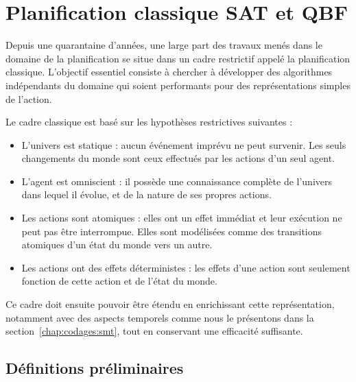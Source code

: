 \section{Planification classique SAT et QBF}\label{chap:codages:satqbf}
%

Depuis une quarantaine d’années, une large part des travaux menés dans le domaine de la planification se situe dans un cadre restrictif appelé la planification classique. L’objectif essentiel consiste à chercher à développer des algorithmes indépendants du domaine qui soient performants pour des représentations simples de l'action.

Le cadre classique est basé sur les hypothèses restrictives suivantes :
\begin{itemize}
\item L’univers est statique : aucun événement imprévu ne peut survenir. Les seuls changements du monde sont ceux effectués par les actions d'un seul agent.
\item L’agent est omniscient : il possède une connaissance complète de l'univers dans lequel il évolue, et de la nature de ses propres actions.
\item Les actions sont atomiques : elles ont un effet immédiat et leur exécution ne peut pas être interrompue. Elles sont modélisées comme des transitions atomiques d'un état du monde vers un autre.
\item Les actions ont des effets déterministes : les effets d'une action sont seulement fonction de cette action et de l'état du monde.
\end{itemize}

Ce cadre doit ensuite pouvoir être étendu en enrichissant cette représentation, notamment avec des aspects temporels comme nous le présentons dans la section~\ref{chap:codages:smt}, tout en conservant une efficacité suffisante.

\subsection{Définitions préliminaires}

